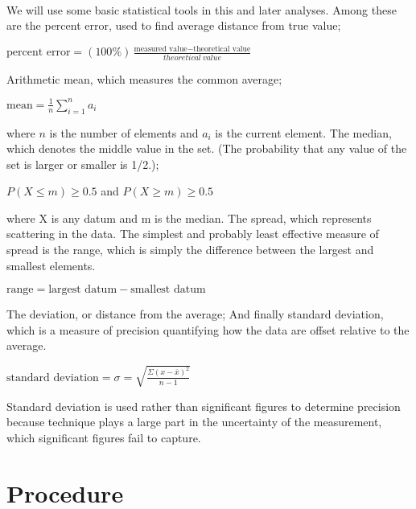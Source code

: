 \documentclass[fleqn,titlepage]{article}
\begin{document}
  \paragraph{} We will use some basic statistical tools in this and later analyses. Among these are the percent error, used to find average distance from true value;
  \begin{center}$\text{percent error} = (100\%)
    \frac{\text{measured\ value} - \text{theoretical\ value}}{theoretical\ value}$\end{center}
  Arithmetic mean, which measures the common average;
  \begin{center}$\text{mean}=\frac{1}{n}\sum\limits_{i=1}^n a_i$\end{center} where $n$ is the number of elements and $a_i$ is the current element.
  The median, which denotes the middle value in the set. (The probability that any value of the set is larger or smaller is 1/2.);
  \begin{center}$P(X \le m) \ge 0.5$ and $P(X \ge m) \ge 0.5$\end{center} where X is any datum and m is the median.
  The spread, which represents scattering in the data. The simplest and probably least effective measure of spread is the range, which is simply the difference between the largest and smallest elements.
  \begin{center}$\text{range} = \text{largest datum} - \text{smallest datum}$\end{center}
  The deviation, or distance from the average; And finally standard deviation, which is a measure of precision quantifying how the data are offset relative to the average. 
 \begin{center}$\text{standard deviation} = \sigma = 
  \sqrt{\frac{\Sigma (x-\bar{x})^2}{n-1}}$\end{center}
Standard deviation is used rather than significant figures to determine precision because technique plays a large part in the uncertainty of the measurement, which significant figures fail to capture.
  \paragraph{}
\newpage
\section{Procedure}
\end{document}
